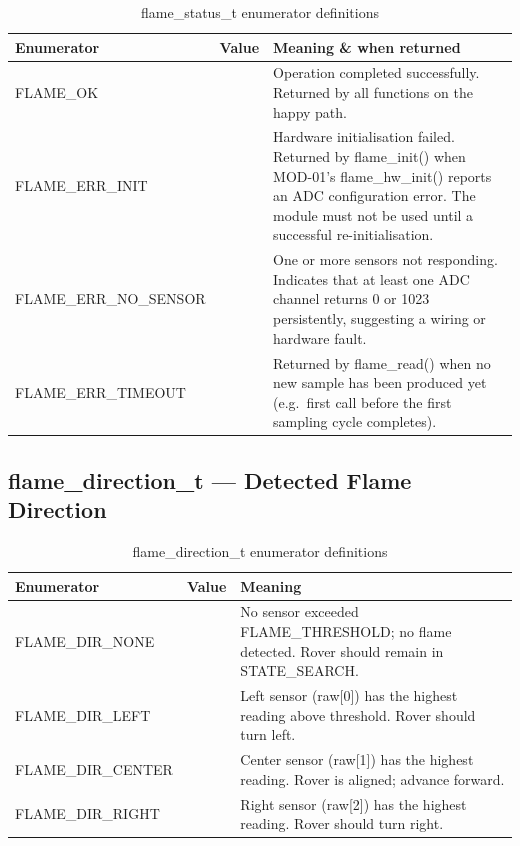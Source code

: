 \documentclass[12pt]{article}
\newcommand{\fn}[1]{{\footnotesize\ttfamily #1}}
\begin{document}
\begin{table}[H]
\centering\small
\begin{tabularx}{\textwidth}{L{4.5cm} C{1cm} X}
\toprule
\textbf{Enumerator} & \textbf{Value} & \textbf{Meaning \& when returned} \\
\midrule
\fn{FLAME\_OK}              & \fn{0}  & Operation completed successfully. Returned by all functions on the happy path. \\
\fn{FLAME\_ERR\_INIT}       & \fn{-1} & Hardware initialisation failed. Returned by \fn{flame\_init()} when MOD-01's \fn{flame\_hw\_init()} reports an ADC configuration error. The module must not be used until a successful re-initialisation. \\
\fn{FLAME\_ERR\_NO\_SENSOR} & \fn{-2} & One or more sensors not responding. Indicates that at least one ADC channel returns 0 or 1023 persistently, suggesting a wiring or hardware fault. \\
\fn{FLAME\_ERR\_TIMEOUT}    & \fn{-3} & Returned by \fn{flame\_read()} when no new sample has been produced yet (e.g.\ first call before the first sampling cycle completes). \\
\bottomrule
\end{tabularx}
\caption{\fn{flame\_status\_t} enumerator definitions}
\end{table}

\subsection{\fn{flame\_direction\_t} --- Detected Flame Direction}

\begin{table}[H]
\centering\small
\begin{tabularx}{\textwidth}{L{4cm} C{1cm} X}
\toprule
\textbf{Enumerator} & \textbf{Value} & \textbf{Meaning} \\
\midrule
\fn{FLAME\_DIR\_NONE}   & \fn{0} & No sensor exceeded \fn{FLAME\_THRESHOLD}; no flame detected. Rover should remain in \fn{STATE\_SEARCH}. \\
\fn{FLAME\_DIR\_LEFT}   & \fn{1} & Left sensor (\fn{raw[0]}) has the highest reading above threshold. Rover should turn left. \\
\fn{FLAME\_DIR\_CENTER} & \fn{2} & Center sensor (\fn{raw[1]}) has the highest reading. Rover is aligned; advance forward. \\
\fn{FLAME\_DIR\_RIGHT}  & \fn{3} & Right sensor (\fn{raw[2]}) has the highest reading. Rover should turn right. \\
\bottomrule
\end{tabularx}
\caption{\fn{flame\_direction\_t} enumerator definitions}
\end{table}
\end{document}
